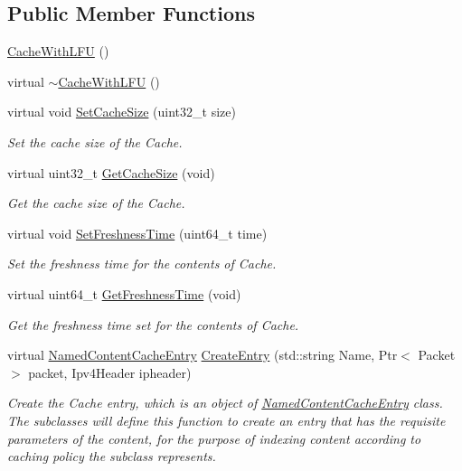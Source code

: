 \subsection*{Public Member Functions}
\begin{DoxyCompactItemize}
\item 
\hyperlink{classns3_1_1CacheWithLFU_ac9d8c2b3be42315700e643d8f2a05ffe}{Cache\-With\-L\-F\-U} ()
\item 
virtual \hyperlink{classns3_1_1CacheWithLFU_af21e5631c7e1541f819162510d093a04}{$\sim$\-Cache\-With\-L\-F\-U} ()
\item 
virtual void \hyperlink{classns3_1_1CacheWithLFU_a80bda10cdbc2edca79e6efe8e4fac60e}{Set\-Cache\-Size} (uint32\-\_\-t size)
\begin{DoxyCompactList}\small\item\em Set the cache size of the Cache. \end{DoxyCompactList}\item 
virtual uint32\-\_\-t \hyperlink{classns3_1_1CacheWithLFU_a2d58ee7990ca6ecf0db3fea70bdc09ef}{Get\-Cache\-Size} (void)
\begin{DoxyCompactList}\small\item\em Get the cache size of the Cache. \end{DoxyCompactList}\item 
virtual void \hyperlink{classns3_1_1CacheWithLFU_a3f5fc35d85cee3f4b405ccabd977662b}{Set\-Freshness\-Time} (uint64\-\_\-t time)
\begin{DoxyCompactList}\small\item\em Set the freshness time for the contents of Cache. \end{DoxyCompactList}\item 
virtual uint64\-\_\-t \hyperlink{classns3_1_1CacheWithLFU_a27a3e1d0b4b308a51ccf58dce5df9bee}{Get\-Freshness\-Time} (void)
\begin{DoxyCompactList}\small\item\em Get the freshness time set for the contents of Cache. \end{DoxyCompactList}\item 
virtual \hyperlink{classns3_1_1NamedContentCacheEntry}{Named\-Content\-Cache\-Entry} \hyperlink{classns3_1_1CacheWithLFU_a214a07a5f2af6c8532ee1a729d252f68}{Create\-Entry} (std\-::string Name, Ptr$<$ Packet $>$ packet, Ipv4\-Header ipheader)
\begin{DoxyCompactList}\small\item\em Create the Cache entry, which is an object of \hyperlink{classns3_1_1NamedContentCacheEntry}{Named\-Content\-Cache\-Entry} class. The subclasses will define this function to create an entry that has the requisite parameters of the content, for the purpose of indexing content according to caching policy the subclass represents. \end{DoxyCompactList}\item 

\end{DoxyCompactItemize}

